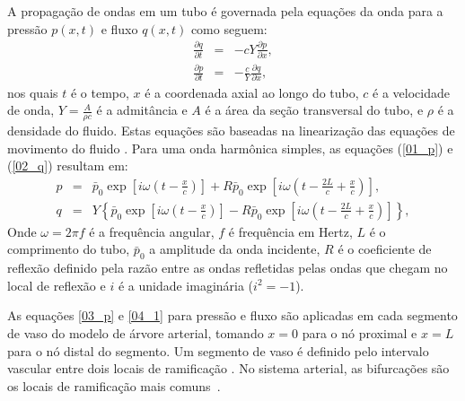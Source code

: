 \documentclass[
        english,			
        brazil			        %
        ,<...>]{abntbibufjf}
\begin{document}
A propagação de ondas em um tubo é governada pela equações da onda para a pressão $p(x,t)$ e fluxo $q(x,t)$ como seguem:
\begin{eqnarray}
\frac{\partial q}{\partial t} &=& -cY \frac{\partial p}{\partial x},
\label{01_p}\\
\frac{\partial p}{\partial t} &=& -\frac{c}{Y} \frac{\partial q}{\partial x}, 
\label{02_q}
\end{eqnarray}
nos quais $t$ é o tempo, $x$ é a coordenada axial ao longo do tubo, $c$ é a velocidade de onda, $Y = \frac{A}{\rho c}$ é a admitância e $A$ é a área da seção transversal do tubo, e $\rho$ é a densidade do fluido. Estas equações são baseadas na linearização das equações de movimento do fluido \cite{Fung,Lighthill}. Para uma onda harmônica simples, as equações (\ref{01_p}) e (\ref{02_q}) resultam em:
\begin{eqnarray}
p &=& \bar{p}_0 \exp\left[i\omega\left(t - \frac{x}{c}\right)\right] + R  \bar{p}_0 \exp\left[i\omega\left(t - \frac{2L}{c} + \frac{x}{c}\right)\right],
\label{03_p}\\
q &=& Y\left\{\bar{p}_0 \exp\left[i\omega\left(t - \frac{x}{c}\right)\right] -  R  \bar{p}_0 \exp\left[i\omega\left(t - \frac{2L}{c} + \frac{x}{c}\right)\right]\right\},
\label{04_1}
\end{eqnarray}
Onde $\omega = 2 \pi f$ é a frequência angular, $f$ é frequência em Hertz, $L$ é o comprimento do tubo, $\bar{p}_0$ a amplitude da onda incidente, $R$ é o coeficiente de reflexão definido pela razão entre as ondas refletidas pelas ondas que chegam no local de reflexão \cite{Fung,Karreman} e $i$ é a unidade imaginária ($i^2 = -1$).

As equações \eqref{03_p} e \eqref{04_1} para pressão e fluxo são aplicadas em cada segmento de vaso do modelo de árvore arterial, tomando $x = 0$ para o nó proximal e $x = L$ para o nó distal do segmento. Um segmento de vaso é definido pelo intervalo vascular entre dois locais de ramificação \cite{Zamir3}. No sistema arterial, as bifurcações são os locais de ramificação mais comuns~\cite{Zamir1}.
\end{document}
